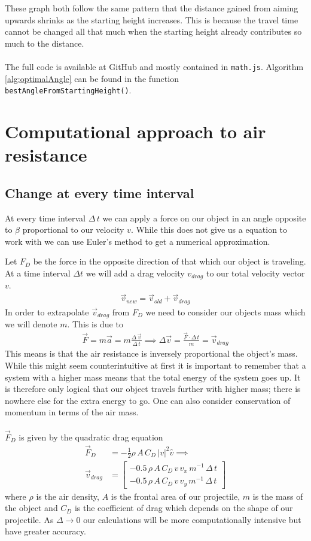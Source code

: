 \documentclass[%
aip,
jmp,
amsmath,amssymb,
reprint,%
]{revtex4-1}
\begin{document}
	These graph both follow the same pattern that the distance gained from aiming upwards shrinks as the starting height increases. This is because the travel time cannot be changed all that much when the starting height already contributes so much to the distance.
	\\~\\
	The full code is available at GitHub\cite{code} and mostly contained in \texttt{math.js}. Algorithm \ref{alg:optimalAngle} can be found in the function \texttt{bestAngleFromStartingHeight()}.
	\section{Computational approach to air resistance}\label{seq:numericalAirRes}
	\subsection{Change at every time interval}
	At every time interval $\Delta\,t$ we can apply a force on our object in an angle opposite to $\beta$ proportional to our velocity $v$. While this does not give us a equation to work with we can use Euler's method to get a numerical approximation.
	
	Let $F_D$ be the force in the opposite direction of that which our object is traveling. At a time interval $\Delta t$ we will add a drag velocity $v_{drag}$ to our total velocity vector $v$.
	\begin{align}\nonumber
		\vec{v}_{new} = \vec{v}_{old} + \vec{v}_{drag}
	\end{align}
	In order to extrapolate $\vec{v}_{drag}$ from $F_D$ we need to consider our objects mass which we will denote $m$. This is due to 
	\begin{align}\nonumber
		\vec{F}=m\vec{a} = m\frac{\Delta\,\vec{v}}{\Delta\,t}\implies \Delta \vec{v} = \frac{\vec{F} \cdot \Delta\,t}{m} = \vec{v}_{drag}
	\end{align}
	This means is that the air resistance is inversely proportional the object's mass. While this might seem counterintuitive at first it is important to remember that a system with a higher mass means that the total energy of the system goes up. It is therefore only logical that our object travels further with higher mass; there is nowhere else for the extra energy to go. One can also consider conservation of momentum in terms of the air mass.
	\\~\\
	$\vec{F}_D$ is given by the quadratic drag equation
	\begin{align}\nonumber
		\vec{F}_D &= -\frac12\rho\,A\,C_D\,|v|^2\hat{v} \implies\\\nonumber
		\vec{v}_{drag} &= \begin{bmatrix}
			-0.5\,\rho\,A\,C_D\,v\,v_x\,m^{-1}\,\Delta\,t\\
			-0.5\,\rho\,A\,C_D\,v\,v_y\,m^{-1}\,\Delta\,t
		\end{bmatrix}
	\end{align}
	where $\rho$ is the air density, $A$ is the frontal area of our projectile, $m$ is the mass of the object and $C_D$ is the coefficient of drag which depends on the shape of our projectile. As $\Delta \rightarrow 0$ our calculations will be more computationally intensive but have greater accuracy.
\end{document}
